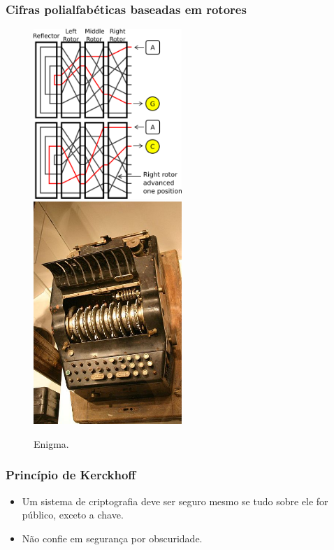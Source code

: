 \begin{frame}
\frametitle{Cifras polialfabéticas baseadas em rotores}
\begin{figure}[h]
\centering
\includegraphics[width=0.5\textwidth,height=0.7\textheight,keepaspectratio]{figures/enigmaaction.png}
\includegraphics[width=0.5\textwidth,height=0.7\textheight,keepaspectratio]{figures/enigma.jpg}
\caption{Enigma.}
\label{fig-enigma}
\end{figure}


\end{frame}



\begin{frame}
\frametitle{Princípio de Kerckhoff}
\begin{itemize}
\item Um sistema de criptografia deve ser seguro mesmo se tudo sobre ele for público, exceto a chave.
\item Não confie em segurança por obscuridade.
\end{itemize}
\end{frame}

